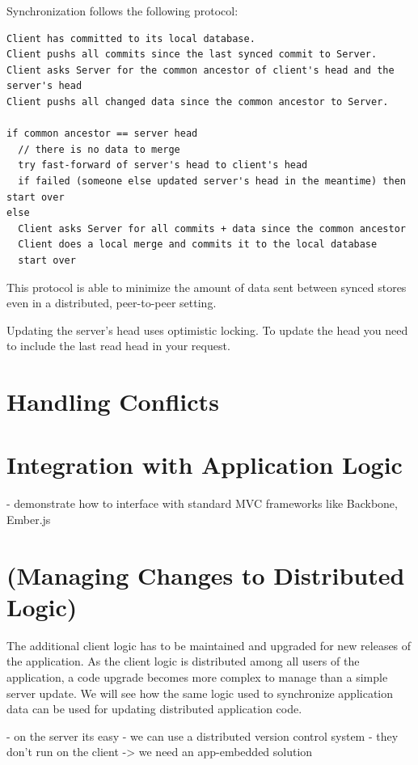 Synchronization follows the following protocol:

\begin{verbatim}
Client has committed to its local database.
Client pushs all commits since the last synced commit to Server.
Client asks Server for the common ancestor of client's head and the server's head
Client pushs all changed data since the common ancestor to Server.

if common ancestor == server head
  // there is no data to merge
  try fast-forward of server's head to client's head
  if failed (someone else updated server's head in the meantime) then start over
else
  Client asks Server for all commits + data since the common ancestor
  Client does a local merge and commits it to the local database
  start over
\end{verbatim}

This protocol is able to minimize the amount of data sent between synced
stores even in a distributed, peer-to-peer setting.

Updating the server's head uses optimistic locking. To update the head
you need to include the last read head in your request.

\section{Handling Conflicts}

\section{Integration with Application Logic}
- demonstrate how to interface with standard MVC frameworks like Backbone, Ember.js

\section{(Managing Changes to Distributed Logic)}
The additional client logic has to be maintained and upgraded for new releases of the application. As the client logic is distributed among all users of the application, a code upgrade becomes more complex to manage than a simple server update. We will see how the same logic used to synchronize application data can be used for updating distributed application code.

- on the server its easy - we can use a distributed version control system
- they don't run on the client -> we need an app-embedded solution

